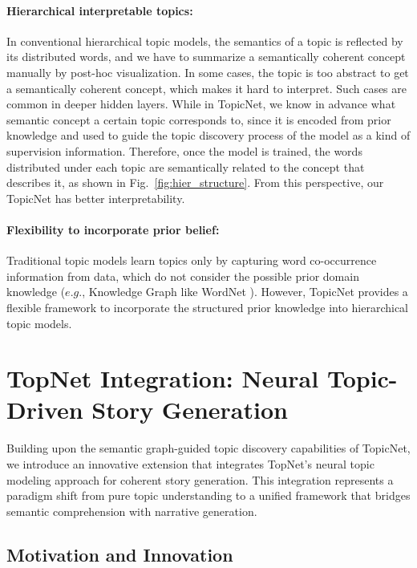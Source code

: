\documentclass{article}
\begin{document}
\paragraph{Hierarchical interpretable topics:} In conventional hierarchical topic models, the semantics of a topic is reflected by its distributed words, and we have to summarize a semantically coherent concept manually by post-hoc visualization. In some cases, the topic is too abstract to get a semantically coherent concept, which makes it hard to interpret. Such cases are common in deeper hidden layers. While in TopicNet, we know in advance what semantic concept a certain topic corresponds to, since it is encoded from prior knowledge and used to guide the topic discovery process of the model as a kind of supervision information. Therefore, once the model is trained, the words distributed under each topic are semantically related to the concept that describes it, as shown in Fig.~\ref{fig:hier_structure}. From this perspective, our TopicNet has better interpretability.
\paragraph{Flexibility to incorporate prior belief:} Traditional topic models learn topics only by capturing word co-occurrence information from data, which do not consider the possible prior domain knowledge ($e.g.$, Knowledge Graph like WordNet \cite{fellbaum2010wordnet}). However, TopicNet provides a flexible framework to incorporate the structured prior knowledge into hierarchical topic models. 

\section{TopNet Integration: Neural Topic-Driven Story Generation} \label{sec:topnet_integration}

Building upon the semantic graph-guided topic discovery capabilities of TopicNet, we introduce an innovative extension that integrates TopNet's neural topic modeling approach for coherent story generation. This integration represents a paradigm shift from pure topic understanding to a unified framework that bridges semantic comprehension with narrative generation.

\subsection{Motivation and Innovation}
\end{document}
